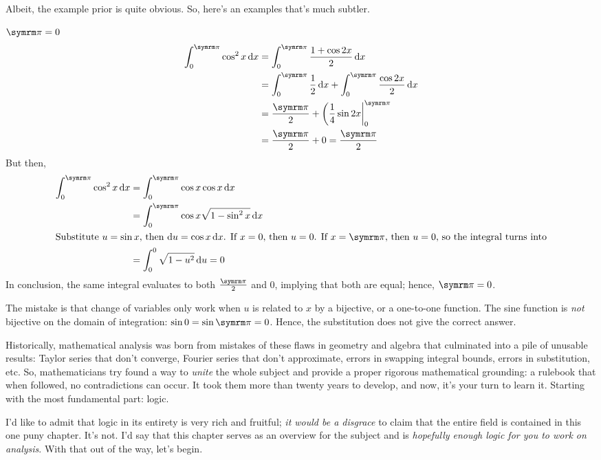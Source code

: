 Albeit, the example prior is quite obvious. So, here's an examples that's much subtler.
\begin{exmp}{\(\cpi = 0\)}{}
  \begin{align}
    \int_{0}^{\cpi} \cos^2{x} \odif{x}
     & = \int_{0}^{\cpi} \frac{1 + \cos{2x}}{2} \odif{x}                                \\
     & = \int_0^{\cpi} \frac{1}{2} \odif{x} + \int_0^{\cpi} \frac{\cos{2x}}{2} \odif{x} \\
     & = \frac{\cpi}{2} + \peval*{\frac{1}{4}\sin{2x}}_0^{\cpi}                         \\
     & = \frac{\cpi}{2} + 0 = \frac{\cpi}{2}
  \end{align}
  But then,
  \begin{align}
    \int_0^{\cpi} \cos^2{x} \odif{x}
     & = \int_0^{\cpi} \cos{x} \cos{x} \odif{x}              \\
     & = \int_0^{\cpi} \cos{x} \sqrt{1 - \sin^2{x}} \odif{x} \\
    \shortintertext{Substitute \(u = \sin{x}\), then \(\odif{u} = \cos{x} \odif{x}\). If \(x = 0\), then \(u = 0\). If \(x = \cpi\), then \(u = 0\), so the integral turns into}
     & = \int_0^0 \sqrt{1 - u^2} \odif{u} = 0
  \end{align}
  In conclusion, the same integral evaluates to both \(\frac{\cpi}{2}\) and \(0\), implying that both are equal; hence, \(\cpi = 0\).
\end{exmp}
The mistake is that change of variables only work when \(u\) is related to \(x\) by a bijective, or a one-to-one function. The sine function is \emph{not} bijective on the domain of integration: \(\sin{0} = \sin{\cpi} = 0\). Hence, the substitution does not give the correct answer.

Historically, mathematical analysis was born from mistakes of these flaws in geometry and algebra that culminated into a pile of unusable results: Taylor series that don't converge, Fourier series that don't approximate, errors in swapping integral bounds, errors in substitution, etc. So, mathematicians try found a way to \emph{unite} the whole subject and provide a proper rigorous mathematical grounding: a rulebook that when followed, no contradictions can occur. It took them more than twenty years to develop, and now, it's your turn to learn it. Starting with the most fundamental part: logic.

I'd like to admit that logic in its entirety is very rich and fruitful; \emph{it would be a disgrace} to claim that the entire field is contained in this one puny chapter. It's not. I'd say that this chapter serves as an overview for the subject and is \emph{hopefully enough logic for you to work on analysis}. With that out of the way, let's begin.

